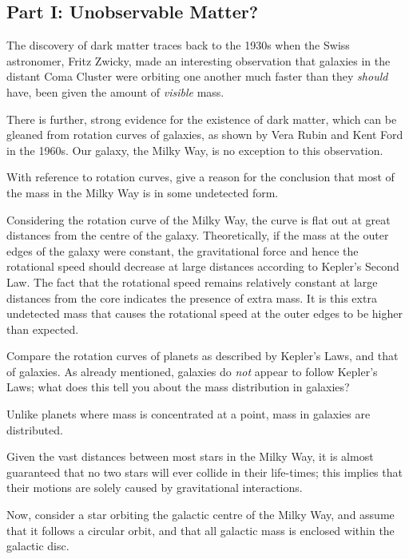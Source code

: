 \documentclass[a4paper,11pt,draft]{exam}
\begin{document}
\subsection*{Part I: Unobservable Matter?}
The discovery of dark matter traces back to the 1930s when the Swiss astronomer, Fritz Zwicky, made an interesting observation that galaxies in the distant Coma Cluster were orbiting one another much faster than they \textit{should} have, been given the amount of \textit{visible} mass.
\begin{questions}
\question[2]
	There is further, strong evidence for the existence of dark matter, which can be gleaned from rotation curves of galaxies, as shown by Vera Rubin and Kent Ford in the 1960s. Our galaxy, the Milky Way, is no exception to this observation.
	
	With reference to rotation curves, give a reason for the conclusion that most of the mass in the Milky Way is in some undetected form.
	\droppoints
	\begin{solution}
		Considering the rotation curve of the Milky Way, the curve is flat out at great distances from the centre of the galaxy. Theoretically, if the mass at the outer edges of the galaxy were constant, the gravitational force and hence the rotational speed should decrease at large distances according to Kepler's Second Law. The fact that the rotational speed remains relatively constant at large distances from the core indicates the presence of extra mass. It is this extra undetected mass that causes the rotational speed at the outer edges to be higher than expected.
	\end{solution}

\question[1]
	Compare the rotation curves of planets as described by Kepler's Laws, and that of galaxies. As already mentioned, galaxies do \textit{not} appear to follow Kepler's Laws; what does this tell you about the mass distribution in galaxies?
	\droppoints
	\begin{solution}
		Unlike planets where mass is concentrated at a point, mass in galaxies are distributed.
	\end{solution}

\question[1]\label{q4c}
	Given the vast distances between most stars in the Milky Way, it is almost guaranteed that no two stars will ever collide in their life-times; this implies that their motions are solely caused by gravitational interactions. 
	
	Now, consider a star orbiting the galactic centre of the Milky Way, and assume that it follows a circular orbit, and that all galactic mass is enclosed within the galactic disc.
	

\end{questions}
\end{document}
